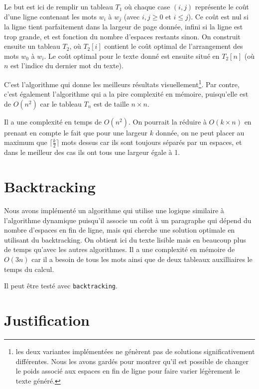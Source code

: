 \documentclass[a4paper, 11pt]{article}
\begin{document}
Le but est ici de remplir un tableau $T_1$ où chaque case $(i, j)$ représente le
coût d'une ligne contenant les mots $w_i$ à $w_j$ (avec $i,j\ge 0$ et $i\le j$).
Ce coût est nul si la ligne tient parfaitement dans la largeur de page donnée,
infini si la ligne est trop grande, et est fonction du nombre d'espaces restants
sinon. On construit ensuite un tableau $T_2$, où $T_2[i]$ contient le coût
optimal de l'arrangement des mots $w_0$ à $w_i$. Le coût optimal pour le texte
donné est ensuite situé en $T_2[n]$ (où $n$ est l'indice du dernier mot du
texte).

C'est l'algorithme qui donne les meilleurs résultats visuellement\footnote{les
deux variantes implémentées ne génèrent pas de solutions significativement
différentes. Nous les avons gardés pour montrer qu'il est possible de changer le
poids associé aux espaces en fin de ligne pour faire varier légèrement le texte
généré.}. Par contre, c'est également l'algorithme qui a la pire complexité
en mémoire, puisqu'elle est de $O(n^2)$ car le tableau $T_n$ est de taille $n
\times n$.

Il a une complexité en temps de $O(n^2)$. On pourrait la réduire à $O(k\times
n)$ en prenant en compte le fait que pour une largeur $k$ donnée, on ne peut
placer au maximum que $\lceil \frac{k}{2} \rceil$ mots dessus car ils sont
toujours séparés par un espaces, et dans le meilleur des cas ils ont tous une
largeur égale à 1.

\section{Backtracking}

Nous avons implémenté un algorithme qui utilise une logique similaire à
l'algorithme dynamique puisqu'il associe un coût à un paragraphe qui dépend du
nombre d'espaces en fin de ligne, mais qui cherche une solution optimale en
utilisant du backtracking. On obtient ici du texte lisible mais en beaucoup plus
de temps qu'avec les autres algorithmes. Il a une complexité en mémoire de
$O(3n)$ car il a besoin de tous les mots ainsi que de deux tableaux auxilliaires
le temps du calcul.

Il peut être testé avec \verb|backtracking|.


\section{Justification}
\label{sec:justification}
\end{document}
